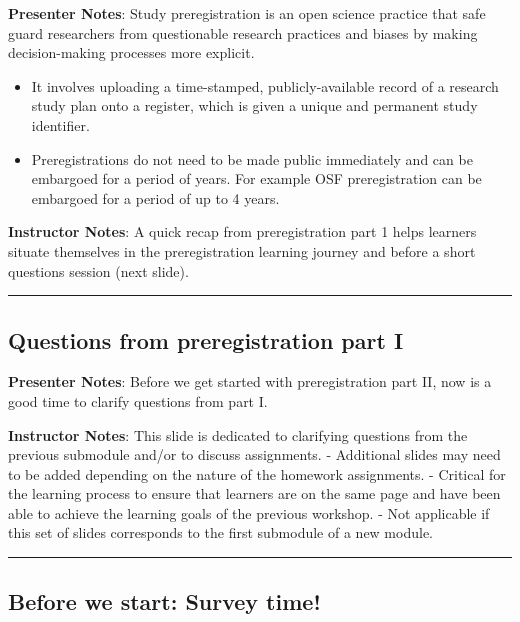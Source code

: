\documentclass[
  letterpaper,
  DIV=11,
  numbers=noendperiod]{scrartcl}
\begin{document}
\textbf{Presenter Notes}: Study preregistration is an open science
practice that safe guard researchers from questionable research
practices and biases by making decision-making processes more explicit.

\begin{itemize}
\item
  It involves uploading a time-stamped, publicly-available record of a
  research study plan onto a register, which is given a unique and
  permanent study identifier.
\item
  Preregistrations do not need to be made public immediately and can be
  embargoed for a period of years. For example OSF preregistration can
  be embargoed for a period of up to 4 years.
\end{itemize}

\textbf{Instructor Notes}: A quick recap from preregistration part 1
helps learners situate themselves in the preregistration learning
journey and before a short questions session (next slide).

\begin{center}\rule{0.5\linewidth}{0.5pt}\end{center}

\subsection{Questions from preregistration part
I}\label{questions-from-preregistration-part-i}

\textbf{Presenter Notes}: Before we get started with preregistration
part II, now is a good time to clarify questions from part I.

\textbf{Instructor Notes}: This slide is dedicated to clarifying
questions from the previous submodule and/or to discuss assignments. -
Additional slides may need to be added depending on the nature of the
homework assignments. - Critical for the learning process to ensure that
learners are on the same page and have been able to achieve the learning
goals of the previous workshop. - Not applicable if this set of slides
corresponds to the first submodule of a new module.

\begin{center}\rule{0.5\linewidth}{0.5pt}\end{center}

\subsection{Before we start: Survey
time!}\label{before-we-start-survey-time}
\end{document}
